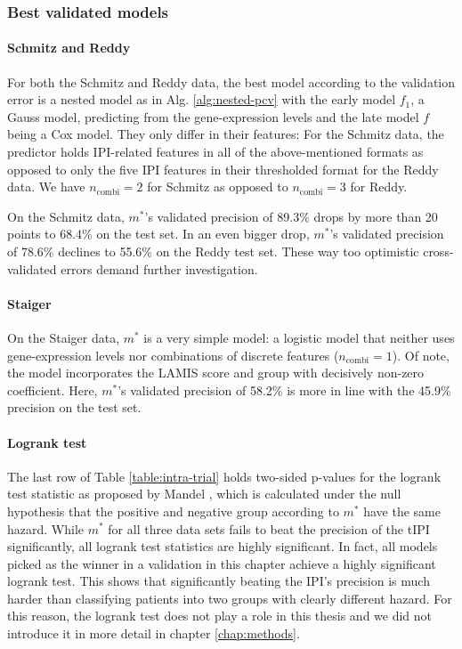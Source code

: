 \subsubsection{Best validated models}

\paragraph{Schmitz and Reddy}
For both the Schmitz and Reddy data, the best model according to the validation error is a nested 
model as in Alg. \ref{alg:nested-pcv} with the early model $f_1$, a Gauss model, predicting from 
the gene-expression levels and the late model $f$ being a Cox model. They only differ in their 
features: For the Schmitz data, the predictor holds IPI-related features in all of the 
above-mentioned formats as opposed to only the five IPI features in their thresholded format for the 
Reddy data. We have $n_\text{combi} = 2$ for Schmitz as opposed to $n_\text{combi} = 3$ for Reddy.

On the Schmitz data, $m^*$'s validated precision of \num{89.3}\% drops by more than \num{20} points 
to \num{68.4}\% on the test set. In an even bigger drop, $m^*$'s validated precision of \num{78.6}\% 
declines to \num{55.6}\% on the Reddy test set. These way too optimistic cross-validated errors 
demand further investigation.

\paragraph{Staiger}
On the Staiger data, $m^*$ is a very simple model: a logistic model that neither uses 
gene-expression levels nor combinations of discrete features ($n_\text{combi} = 1$). Of note, the 
model incorporates the LAMIS score and group with decisively non-zero coefficient. Here, $m^*$'s 
validated precision of \num{58.2}\% is more in line with the \num{45.9}\% precision on the test set.

\paragraph{Logrank test}
The last row of Table \ref{table:intra-trial} holds two-sided p-values for the logrank test
statistic as proposed by Mandel \cite{mantel66}, which is calculated under the null hypothesis 
that the positive and negative group according to $m^*$ have the same hazard. While $m^*$ for all 
three data sets fails to beat the precision of the tIPI significantly, all logrank test statistics 
are highly significant. In fact, all models picked as the winner in a validation in this chapter 
achieve a highly significant logrank test. This shows that significantly beating the 
IPI's precision is much harder than classifying patients into two groups with clearly different 
hazard. For this reason, the logrank test does not play a role in this thesis and we did not 
introduce it in more detail in chapter \ref{chap:methods}.

